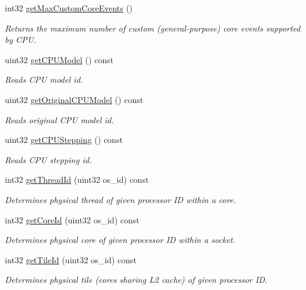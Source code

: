 \begin{DoxyCompactItemize}
\mbox{\label{class_p_c_m_a945943a093784e959f2b5930aac85080}} 
int32 \mbox{\hyperlink{class_p_c_m_a945943a093784e959f2b5930aac85080}{get\+Max\+Custom\+Core\+Events}} ()
\begin{DoxyCompactList}\small\item\em Returns the maximum number of custom (general-\/purpose) core events supported by C\+PU. \end{DoxyCompactList}\item 
uint32 \mbox{\hyperlink{class_p_c_m_a5f8c7d4c978238706fe74ec00c803f9a}{get\+C\+P\+U\+Model}} () const
\begin{DoxyCompactList}\small\item\em Reads C\+PU model id. \end{DoxyCompactList}\item 
uint32 \mbox{\hyperlink{class_p_c_m_ade53fbb558df9f80eac56435f2bd0e55}{get\+Original\+C\+P\+U\+Model}} () const
\begin{DoxyCompactList}\small\item\em Reads original C\+PU model id. \end{DoxyCompactList}\item 
uint32 \mbox{\hyperlink{class_p_c_m_afcf71f98767227aa64821a715bfab099}{get\+C\+P\+U\+Stepping}} () const
\begin{DoxyCompactList}\small\item\em Reads C\+PU stepping id. \end{DoxyCompactList}\item 
int32 \mbox{\hyperlink{class_p_c_m_a728347cf85816c42833a1a8a1f14b861}{get\+Thread\+Id}} (uint32 os\+\_\+id) const
\begin{DoxyCompactList}\small\item\em Determines physical thread of given processor ID within a core. \end{DoxyCompactList}\item 
int32 \mbox{\hyperlink{class_p_c_m_a90eb072bebf4be22bce23d550983f6fe}{get\+Core\+Id}} (uint32 os\+\_\+id) const
\begin{DoxyCompactList}\small\item\em Determines physical core of given processor ID within a socket. \end{DoxyCompactList}\item 
int32 \mbox{\hyperlink{class_p_c_m_a2b4433865e00da98c4fa588cb1be913c}{get\+Tile\+Id}} (uint32 os\+\_\+id) const
\begin{DoxyCompactList}\small\item\em Determines physical tile (cores sharing L2 cache) of given processor ID. \end{DoxyCompactList}\item 

\end{DoxyCompactItemize}
